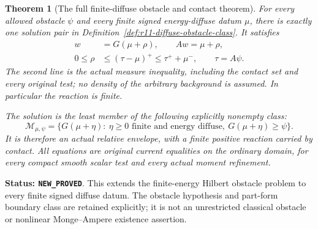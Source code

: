 \documentclass[11pt,a4paper]{article}
\numberwithin{equation}{section}
\newtheorem{theorem}{Theorem}[section]
\theoremstyle{definition}
\theoremstyle{remark}
\begin{document}
\begin{theorem}[The full finite-diffuse obstacle and contact theorem]
\label{thm:r11-diffuse-obstacle-contact}
For every allowed obstacle $\psi$ and every finite signed
energy-diffuse datum $\mu$, there is exactly one solution pair in
Definition~\ref{def:r11-diffuse-obstacle-class}.  It satisfies
\[
 \begin{split}
 w&=G(\mu+\rho),\qquad Aw=\mu+\rho,\\
 0\le\rho&\le(\tau-\mu)^+\le\tau^++\mu^-,\qquad \tau=A\psi.
 \end{split}
 \tag{OB8}
\]
The second line is the actual measure inequality, including the
contact set and every original test; no density of the arbitrary
background is assumed.  In particular the reaction is finite.

The solution is the least member of the following explicitly
nonempty class:
\[
 \mathscr M_{\mu,\psi}=
 \{G(\mu+\eta):\ \eta\ge0\text{ finite and energy diffuse},\
                         G(\mu+\eta)\ge\psi\}.
 \tag{OB9}
\]
It is therefore an actual relative envelope, with a finite positive
reaction carried by contact.  All equations are original current
equalities on the ordinary domain, for every compact smooth scalar
test and every actual moment refinement.
\end{theorem}

\noindent\textbf{Status: \texttt{NEW\_PROVED}}.  This extends the
finite-energy Hilbert obstacle problem to every finite signed diffuse
datum.  The obstacle hypothesis and part-form boundary class are
retained explicitly; it is not an unrestricted classical obstacle or
nonlinear Monge--Ampere existence assertion.
\end{document}
